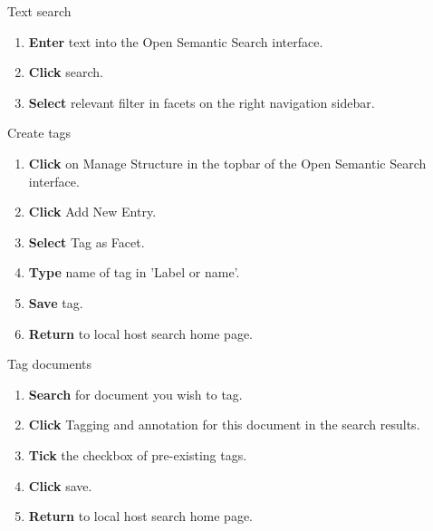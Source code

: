 \documentclass[10pt,a4paper]{article}
\begin{document}
\begin{textbox}{Text search}
 
  

\begin{enumerate}
\item \textbf{Enter} text into the Open Semantic Search interface. 
\item \textbf{Click} search.
\item \textbf{Select} relevant filter in facets on the right navigation sidebar. 
\end{enumerate}

\end{textbox}


\begin{textbox}{Create tags}
 

  

\begin{enumerate}
\item \textbf{Click} on Manage Structure in the topbar of the Open Semantic Search interface.
\item \textbf{Click} Add New Entry.
\item \textbf{Select} Tag as Facet. 
\item \textbf{Type} name of tag in 'Label or name'.
\item \textbf{Save} tag. 
\item \textbf{Return} to local host search home page.
 
\end{enumerate}

\end{textbox}

\begin{textbox}{Tag documents}

  

\begin{enumerate}
\item \textbf{Search} for document you wish to tag.
\item \textbf{Click} Tagging and annotation for this document in the search results.
\item \textbf{Tick} the checkbox of pre-existing tags. 
\item \textbf{Click} save. 
\item \textbf{Return} to local host search home page.
\end{enumerate}

\end{textbox}
\end{document}
